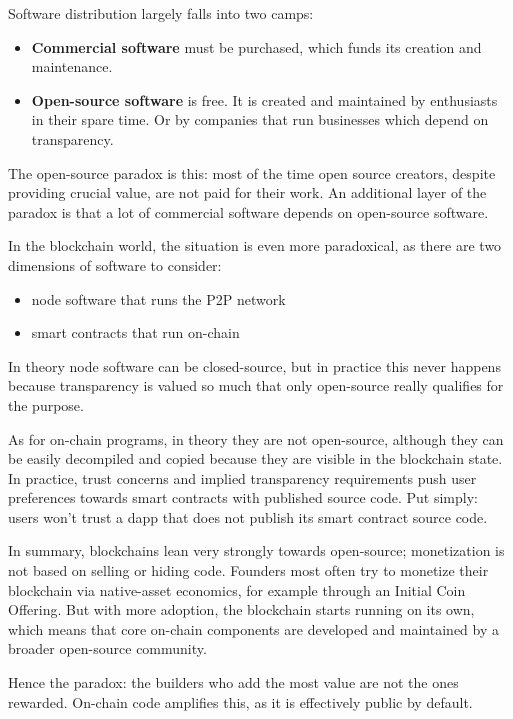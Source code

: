\documentclass[a4paper]{article}
\begin{document}
Software distribution largely falls into two camps:

\begin{itemize}
  \item \textbf{Commercial software} must be purchased, which funds its creation and maintenance.
  \item \textbf{Open-source software} is free. It is created and maintained by enthusiasts in their spare time. Or by companies that run businesses which depend on transparency.
\end{itemize}

The open-source paradox is this: most of the time open source creators, despite providing crucial value, are not paid for their work. An additional layer of the paradox is that a lot of commercial software depends on open-source software.

In the blockchain world, the situation is even more paradoxical, as there are two dimensions of software to consider:

\begin{itemize}
  \item node software that runs the P2P network
  \item smart contracts that run on-chain
\end{itemize}

In theory node software can be closed-source, but in practice this never happens because transparency is valued so much that only open-source really qualifies for the purpose.

As for on-chain programs, in theory they are not open-source, although they can be easily decompiled and copied because they are visible in the blockchain state. In practice, trust concerns and implied transparency requirements push user preferences towards smart contracts with published source code. Put simply: users won't trust a dapp that does not publish its smart contract source code.

In summary, blockchains lean very strongly towards open-source; monetization is not based on selling or hiding code. Founders most often try to monetize their blockchain via native-asset economics, for example through an Initial Coin Offering. But with more adoption, the blockchain starts running on its own, which means that core on-chain components are developed and maintained by a broader open-source community.

Hence the paradox: the builders who add the most value are not the ones rewarded. On-chain code amplifies this, as it is effectively public by default.
\end{document}
